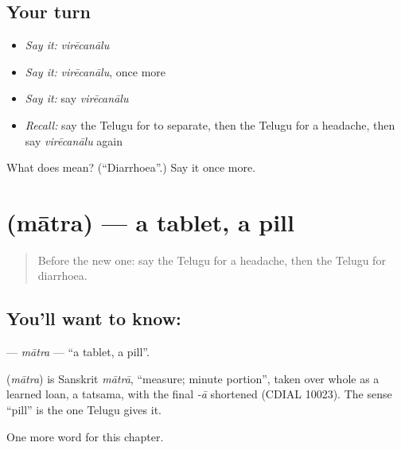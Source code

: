 \subsection*{Your turn}
\begin{itemize}
\raggedright
  \item \emph{Say it:} \emph{virēcanālu}
  \item \emph{Say it:} \emph{virēcanālu}, once more
  \item \emph{Say it:} say \emph{virēcanālu}
  \item \emph{Recall:} say the Telugu for to separate, then the Telugu for a headache, then say \emph{virēcanālu} again
\end{itemize}

\begin{tcolorbox}[breakable,colback=teal!4,colframe=teal!35!black,title={Before you move on}]
What does  mean? (\textquotedblleft{}Diarrhoea\textquotedblright{}.) Say it once more.
\end{tcolorbox}
\section[\texorpdfstring{\te{మాత్ర} (mātra)}{మాత్ర (mātra)}]{ (mātra) — a tablet, a pill}

\label{lesson:TE-C167-matra}



\begin{quote}
Before the new one: say the Telugu for a headache, then the Telugu for diarrhoea.
\end{quote}

\subsection*{You'll want to know: }
\textbf{} — \emph{mātra} — \textquotedblleft{}a tablet, a pill\textquotedblright{}.

\begin{cousinweb}
\textbf{} (\emph{mātra}) is Sanskrit \emph{mātrā}, \textquotedblleft{}measure; minute portion\textquotedblright{}, taken over whole as a learned loan, a tatsama, with the final \emph{-ā} shortened (CDIAL 10023). The sense \textquotedblleft{}pill\textquotedblright{} is the one Telugu gives it.
\end{cousinweb}

\begin{grammarlens}[title={What you've built}]
One more word for this chapter.
\end{grammarlens}

